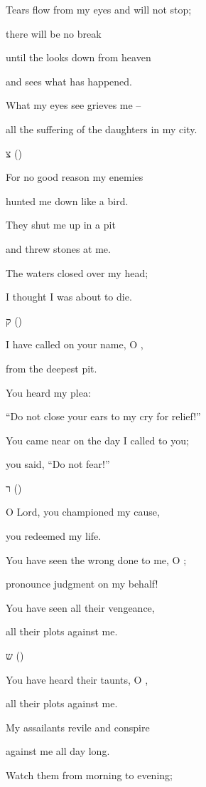 {\par }{\Q {}Tears flow from my eyes and will not stop;
\par }{\Q there will be no break
\par }{\Q {}until
the {}
looks
down from heaven
\par }{\Q and sees what has happened.
\par }{\Q {}What my eyes
see grieves me –
\par }{\Q all the suffering of the daughters in my city.
\par }{\SH צ ({})
\par }{\Q {}For no good reason my enemies
\par }{\Q hunted me down like a bird.
\par }{\Q {}They shut
me up in a pit
\par }{\Q and threw
stones at me.
\par }{\Q {}The waters
closed
over
my head;
\par }{\Q I thought I was about to die.
\par }{\SH ק ({})
\par }{\Q {}I have called on your name, O
{},
\par }{\Q from the deepest pit.
\par }{\Q {}You heard
my plea:

\par }{\Q “Do not
close
your ears
to my cry
for relief!”
\par }{\Q {}You came near
on the day
I called
to you;
\par }{\Q you said, “Do not
fear!”
\par }{\SH ר ({})
\par }{\Q {}O Lord, you championed my cause,
\par }{\Q you redeemed my life.
\par }{\Q {}You have seen
the wrong
done to me, O
{};
\par }{\Q pronounce
judgment on my behalf!
\par }{\Q {}You have seen
all
their vengeance,
\par }{\Q all
their plots against me.
\par }{\SH ש ({})
\par }{\Q {}You have heard their taunts, O
{},
\par }{\Q all their plots against me.
\par }{\Q {}My assailants revile
and conspire
\par }{\Q against
me all
day long.
\par }{\Q {}Watch
them
from morning
to evening;

}
